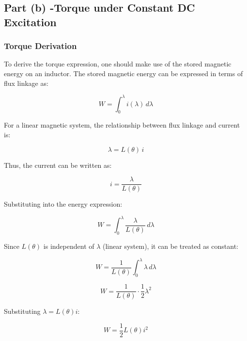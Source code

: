 \documentclass[12pt, a4paper]{article}
\begin{document}
\subsection{Part (b) -Torque under Constant DC Excitation}

\subsubsection{Torque Derivation}

To derive the torque expression, one should make use of the stored magnetic energy on an inductor. The stored magnetic energy can be expressed in terms of flux linkage as:

\begin{equation}
W = \int_{0}^{\lambda} i(\lambda)\, d\lambda
\end{equation}

For a linear magnetic system, the relationship between flux linkage and current is:

\begin{equation}
\lambda = L(\theta)\, i
\end{equation}

Thus, the current can be written as:

\begin{equation}
i = \frac{\lambda}{L(\theta)}
\end{equation}

Substituting into the energy expression:

\begin{equation}
W = \int_{0}^{\lambda} \frac{\lambda}{L(\theta)} \, d\lambda
\end{equation}

Since $L(\theta)$ is independent of $\lambda$ (linear system), it can be treated as constant:

\begin{equation}
W = \frac{1}{L(\theta)} \int_{0}^{\lambda} \lambda \, d\lambda
\end{equation}

\begin{equation}
W = \frac{1}{L(\theta)} \cdot \frac{1}{2} \lambda^2
\end{equation}

Substituting $\lambda = L(\theta)i$:

\begin{equation}
W = \frac{1}{2} L(\theta) i^2
\label{eq:energy}
\end{equation}
\end{document}
